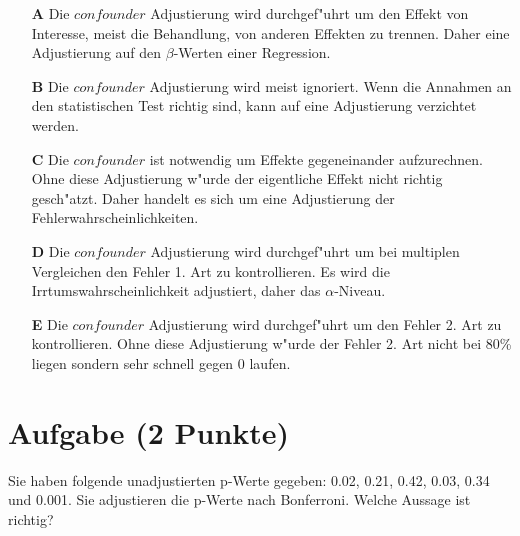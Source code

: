 \documentclass[a4paper, 10pt]{scrartcl}\usepackage[]{graphicx}\usepackage[]{color}
\begin{document}
\begin{enumerate}
\item [\textbf{A} \msquare] Die $confounder$ Adjustierung wird durchgef{"u}hrt um den Effekt von Interesse, meist die Behandlung, von anderen Effekten zu trennen. Daher eine Adjustierung auf den $\beta$-Werten einer Regression.
\item [\textbf{B} \msquare] Die $confounder$ Adjustierung wird meist ignoriert. Wenn die Annahmen an den statistischen Test richtig sind, kann auf eine Adjustierung verzichtet werden.
\item [\textbf{C} \msquare] Die $confounder$ ist notwendig um Effekte gegeneinander aufzurechnen. Ohne diese Adjustierung w{"u}rde der eigentliche Effekt nicht richtig gesch{"a}tzt. Daher handelt es sich um eine Adjustierung der Fehlerwahrscheinlichkeiten.
\item [\textbf{D} \msquare] Die $confounder$ Adjustierung wird durchgef{"u}hrt um bei multiplen Vergleichen den Fehler 1. Art zu kontrollieren. Es wird die Irrtumswahrscheinlichkeit adjustiert, daher das $\alpha$-Niveau.
\item [\textbf{E} \msquare] Die $confounder$ Adjustierung wird durchgef{"u}hrt um den Fehler 2. Art zu kontrollieren. Ohne diese Adjustierung w{"u}rde der Fehler 2. Art nicht bei 80\% liegen sondern sehr schnell gegen 0 laufen.
\end{enumerate} 

\section{Aufgabe \hfill (2 Punkte)}



Sie haben folgende unadjustierten p-Werte gegeben: 0.02, 0.21, 0.42, 0.03, 0.34 und 0.001. Sie adjustieren die p-Werte nach
Bonferroni. Welche Aussage ist richtig?
\end{document}
